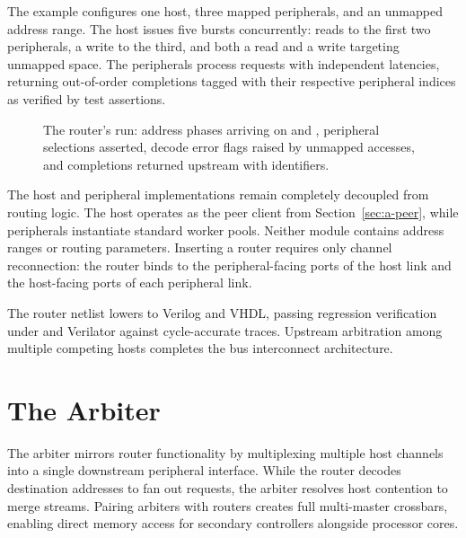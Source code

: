 \documentclass[journal,9pt]{IEEEtran}
\begin{document}
The example  configures one host, three mapped
peripherals, and an unmapped address range. The host issues five bursts
concurrently: reads to the first two peripherals, a write to the third, and
both a read and a write targeting unmapped space. The peripherals process
requests with independent latencies, returning out-of-order completions
tagged with their respective peripheral indices as verified by test
assertions.

\begin{figure}[t]
\centering

\caption{The router's run: address phases arriving on  and
, peripheral selections asserted, decode error flags raised by
unmapped accesses, and completions returned upstream with identifiers.}
\label{fig:a-router}
\end{figure}





The host and peripheral implementations remain completely decoupled from
routing logic. The host operates as the peer client from
Section~\ref{sec:a-peer}, while peripherals instantiate standard 
worker pools. Neither module contains address ranges or routing parameters.
Inserting a router requires only channel reconnection: the router binds to
the peripheral-facing ports of the host link and the host-facing ports of
each peripheral link.

The router netlist lowers to Verilog and VHDL, passing regression verification
under  and Verilator against cycle-accurate traces. Upstream
arbitration among multiple competing hosts completes the bus interconnect
architecture.

\section{The Arbiter}
\label{sec:a-arbiter}

The arbiter mirrors router functionality by multiplexing multiple host
channels into a single downstream peripheral interface. While the router
decodes destination addresses to fan out requests, the arbiter resolves host
contention to merge streams. Pairing arbiters with routers creates full
multi-master crossbars, enabling direct memory access for secondary
controllers alongside processor cores.
\end{document}
